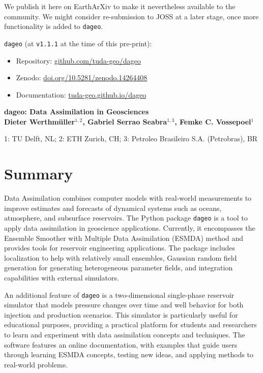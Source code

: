 \documentclass[a4paper, colorlinks=false, 11pt, parskip=half,
               notitlepage, oneside, fleqn, pdftex]{scrartcl}
\begin{document}
We publish it here on EarthArXiv to make it nevertheless available to the
community. We might consider re-submission to JOSS at a later stage, once more
functionality is added to \texttt{dageo}.

\vfill

\texttt{dageo} (at \texttt{v1.1.1} at the time of this pre-print):
\begin{itemize}
  \item Repository:
    \href{https://github.com/tuda-geo/dageo}{github.com/tuda-geo/dageo}
  \item Zenodo:
    \href{https://doi.org/10.5281/zenodo.14264408}{doi.org/10.5281/zenodo.14264408}
  \item Documentation:
    \href{https://tuda-geo.github.io/dageo}{tuda-geo.github.io/dageo}
\end{itemize}

\newpage
\addtocounter{page}{-1}

\textbf{\LARGE dageo: Data Assimilation in Geosciences}\\

\textbf{\large
  Dieter Werthmüller$^{1, 2}$,
  Gabriel Serrao Seabra$^{1, 3}$,
  Femke C. Vossepoel$^{1}$
}

{\small
  1: TU Delft, NL; 2: ETH Zurich, CH; 3: Petroleo Brasileiro S.A. (Petrobras), BR
}



\section*{Summary}

Data Assimilation combines computer models with real-world measurements to
improve estimates and forecasts of dynamical systems such as oceans,
atmosphere, and subsurface reservoirs. The Python package \texttt{dageo} is a
tool to apply data assimilation in geoscience applications. Currently, it
encompasses the Ensemble Smoother with Multiple Data Assimilation (ESMDA)
method and provides tools for reservoir engineering applications. The package
includes localization to help with relatively small ensembles, Gaussian random
field generation for generating heterogeneous parameter fields, and integration
capabilities with external simulators.

An additional feature of \texttt{dageo} is a two-dimensional single-phase
reservoir simulator that models pressure changes over time and well behavior
for both injection and production scenarios. This simulator is particularly
useful for educational purposes, providing a practical platform for students
and researchers to learn and experiment with data assimilation concepts and
techniques. The software features an online documentation, with examples that
guide users through learning ESMDA concepts, testing new ideas, and applying
methods to real-world problems.
\end{document}
